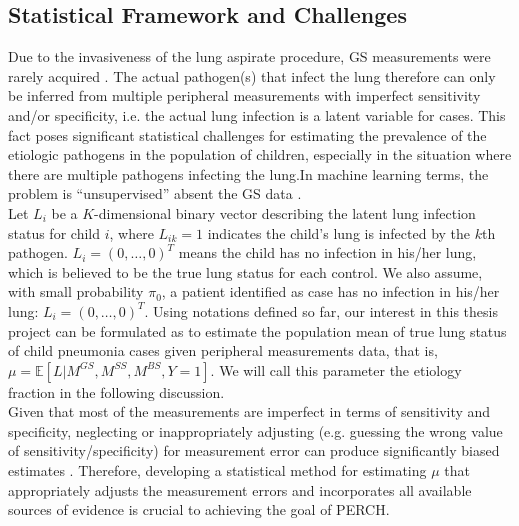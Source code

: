 \documentclass[11 pt, a4paper]{article}  %
\begin{document}
\subsection{Statistical Framework and Challenges}
Due to the invasiveness of the lung aspirate procedure, GS measurements were rarely acquired \cite{levine2012pneumonia, hammitt2012specimen}. The actual pathogen(s) that infect the lung therefore can only be inferred from multiple peripheral measurements with imperfect sensitivity and/or specificity, i.e. the actual lung infection is a latent variable for cases. This fact poses significant statistical challenges for estimating the prevalence of the etiologic pathogens in the population of children, especially in the situation where there are multiple pathogens infecting the lung.In machine learning terms, the problem is ``unsupervised'' absent the GS data \cite{friedman2001elements}.\\

Let $L_i$ be a $K$-dimensional binary vector describing the latent lung infection status for child $i$, where $L_{ik}=1$ indicates the child's lung is infected by the $k$th pathogen. $L_i = (0,\ldots,0)^T$ means the child has no infection in his/her lung, which is believed to be the true lung status for each control. We also assume, with small probability $\pi_0$, a patient identified as case has no infection in his/her lung: $L_i = (0,\ldots,0)^T$. Using notations defined so far, our interest in this thesis project can be formulated as to estimate the population mean of true lung status of child pneumonia cases given peripheral measurements data, that is, $\mu = \mathbb{E}[L|M^{GS},M^{SS},M^{BS},Y=1]$. We will call this parameter the etiology fraction in the following discussion.\\

Given that most of the measurements are imperfect in terms of sensitivity and specificity, neglecting or inappropriately adjusting (e.g. guessing the wrong value of sensitivity/specificity) for measurement error can produce significantly biased estimates \cite{gustafson2002bayesian}. Therefore, developing a statistical method for estimating $\mu$ that appropriately adjusts the measurement errors and incorporates all available sources of evidence is crucial to achieving the goal of PERCH. \\
\end{document}
